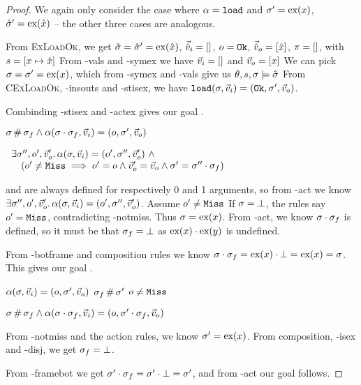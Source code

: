 \begin{proof}
We again only consider the case where $\alpha=\texttt{load}$ and $\sigma'=\text{ex}(x)$, $\hat{\sigma}'=\text{ex}(\hat{x})$ -- the other three cases are analogous.
\begin{hypvlist}
 From \textsc{ExLoadOk}, we get $\hat{\sigma}=\hat{\sigma}'=\text{ex}(\hat{x})$, $\vec{\hat{v}}_i=[]$, $o=\texttt{Ok}$, $\vec{\hat{v}}_o=[\hat{x}]$, $\pi=[]$, with $s=[x\mapsto \hat{x}]$
 From \hyp{vals} and \hyp{symex} we have $\vec{v}_i=[]$ and $\vec{v}_o=[x]$
 We can pick $\sigma=\sigma'=\text{ex}(x)$, which from \hyp{symex} and \hyp{vals} give us $\theta,s,\sigma\models\hat{\sigma}$
 From \textsc{CExLoadOk}, \hyp{insouts} and \hyp{stisex}, we have $\texttt{load}(\sigma,\vec{v}_i)=(\texttt{Ok},\sigma',\vec{v}_o)$.
\end{hypvlist}
Combinding \hyp{stisex} and \hyp{actex} gives our goal .


\pfassume \begin{hypvlist}
 $\sigma\operatorname{\#}\sigma_f \land \alpha(\sigma\cdot\sigma_f,\vec{v}_i)=(o,\sigma',\vec{v}_o)$
\end{hypvlist}
\pfprove \begin{goalvlist}
 $\begin{array}{l}
\exists \sigma'', o', \vec{v}_o'\ldotp \alpha(\sigma,\vec{v}_i)=(o', \sigma'', \vec{v}_o') ~\land \\
\quad(o' \neq \texttt{Miss} \implies o' = o \land  \vec{v}_o' = \vec{v}_o \land \sigma' = \sigma'' \cdot \sigma_f)
\end{array}$
\end{goalvlist}
\begin{hypvlist}
	 \load{} and \store{} are always defined for respectively 0 and 1 arguments, so from \hyp{act} we know $\exists \sigma'', o', \vec{v}_o'\ldotp \alpha(\sigma,\vec{v}_i)=(o', \sigma'', \vec{v}_o')$.
	 Assume $o'\neq\texttt{Miss}$
	 If $\sigma=\bot$, the rules say $o'=\texttt{Miss}$, contradicting \hyp{notmiss}. Thus $\sigma=\text{ex}(x)$.
	 From \hyp{act}, we know $\sigma\cdot\sigma_f$ is defined, so it must be that $\sigma_f=\bot$ as $\text{ex}(x)\cdot\text{ex}(y)$ is undefined.
\end{hypvlist}
From \hyp{botframe} and composition rules we know $\sigma\cdot\sigma_f=\text{ex}(x)\cdot\bot=\text{ex}(x)=\sigma$. This gives our goal .


\pfassume \begin{hypvlist}
 $\alpha(\sigma,\vec{v}_i)=(o,\sigma',\vec{v}_o)$
 $\sigma_f\operatorname{\#}\sigma'$
 $o\neq\texttt{Miss}$
\end{hypvlist}
\pfprove \begin{goalvlist}
 $\sigma \operatorname{\#} \sigma_f \land \alpha(\sigma\cdot\sigma_f, \vec{v}_i)=(o, \sigma'\cdot\sigma_f, \vec{v}_o)$	
\end{goalvlist}
\begin{hypvlist}
 From \hyp{notmiss} and the action rules, we know $\sigma'=\text{ex}(x)$.
 From composition, \hyp{isex} and \hyp{disj}, we get $\sigma_f=\bot$.
\end{hypvlist}
From \hyp{framebot} we get $\sigma'\cdot\sigma_f=\sigma'\cdot\bot=\sigma'$, and from \hyp{act} our goal  follows.


\end{proof}

